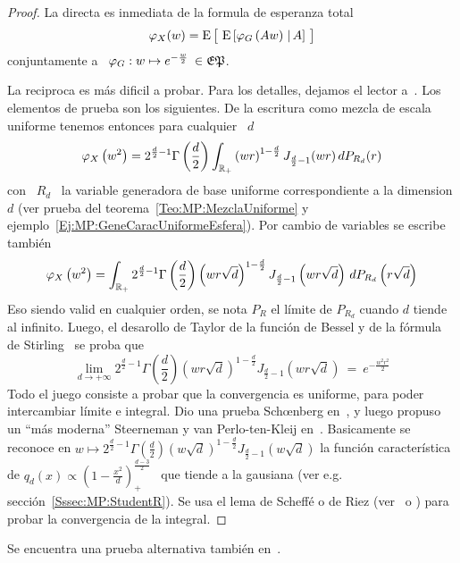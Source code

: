 \begin{proof}
  La directa es inmediata de la formula de esperanza total
  \[
  \varphi_X(w)  =  \operatorname{E}\big[ \,  \operatorname{E}\left[  \varphi_G\left( A w \right)  \left.  \right|
      A\right] \, \big]
  \]
  conjuntamente a \ $\varphi_G: w \mapsto e^{-\frac{w}{2}} \: \in \mathfrak{EP}$.

  La reciproca es  m\'as dificil a probar. Para los  detalles, dejamos el lector
  a~\cite{Sch38}. Los  elementos de prueba  son los siguientes. De  la escritura
  como mezcla de escala uniforme tenemos entonces para cualquier \ $d$
  \[
  \varphi_X\left(  w^2  \right)   =  2^{\frac{d}{2}-1}  \Gamma\left(  \frac{d}{2}
  \right) \int_{\mathbb{R}_+} \left(  w r \right)^{1-\frac{d}{2}} J_{\frac{d}{2}-1}(w
  r) \, dP_{R_d}(r)
  \]
  con \  $R_d$ \ la  variable generadora de  base uniforme correspondiente  a la
  dimension   $d$   (ver   prueba  del   teorema~\ref{Teo:MP:MezclaUniforme}   y
  ejemplo~\ref{Ej:MP:GeneCaracUniformeEsfera}).  Por   cambio  de  variables  se
  escribe tambi\'en
  \[
  \varphi_X\left(  w^2 \right)  = \int_{\mathbb{R}_+}  2^{\frac{d}{2}-1} \Gamma\left(
    \frac{d}{2}   \right)   \left(    w   r   \sqrt{d}   \right)^{1-\frac{d}{2}}
  J_{\frac{d}{2}-1}\left(  w r  \sqrt{d}  \right) \,  dP_{R_d}\left( r  \sqrt{d}
  \right)
  \]
  Eso siendo  valid en cualquier orden,  se nota $P_R$ el  l\'imite de $P_{R_d}$
  cuando $d$ tiende al infinito.  Luego,  el desarollo de Taylor de la funci\'on
  de Bessel  y de  la f\'ormula de  Stirling~\cite[Ec.~8.402~y~8.327]{GraRyz} se
  proba que
  \[
  \lim_{d \to +\infty} 2^{\frac{d}{2}-1} \Gamma\left( \frac{d}{2} \right) \left(
    w  r \sqrt{d} \right)^{1-\frac{d}{2}}  J_{\frac{d}{2}-1}\left( w  r \sqrt{d}
  \right) \: = \: e^{-\frac{w^2 r^2}{2}}
  \]
  Todo el  juego consiste a probar  que la convergencia es  uniforme, para poder
  intercambiar   l\'imite   e    integral.    Dio   una   prueba   Sch{\oe}nberg
  en~\cite{Sch38},  y  luego  propuso  un  ``m\'as moderna''  Steerneman  y  van
  Perlo-ten-Kleij  en~\cite{SteVan05}.  Basicamente  se reconoce  en  $w \mapsto
  2^{\frac{d}{2}-1}   \Gamma\left(  \frac{d}{2}   \right)   \left(  w   \sqrt{d}
  \right)^{1-\frac{d}{2}}   J_{\frac{d}{2}-1}\left(  w   \sqrt{d}   \right)$  la
  funci\'on  caracter\'istica  de  $q_d(x)  \propto  \left(  1  -  \frac{x^2}{d}
  \right)_+^{\frac{d-3}{2}}$   \   que   tiende   a  la   gausiana   (ver   e.g.
  secci\'on~\ref{Sssec:MP:StudentR}).   Se usa el  lema de  Scheff\'e o  de Riez
  (ver~\cite{Rie28,  Sch47, Nov72,  Kus10} o  \cite{AthLah06,  Bog07:v1, Bil12})
  para probar la convergencia de la integral.
\end{proof}
%
\noindent Se encuentra una prueba alternativa tambi\'en en~\cite{FanKot90, Kin72}.

